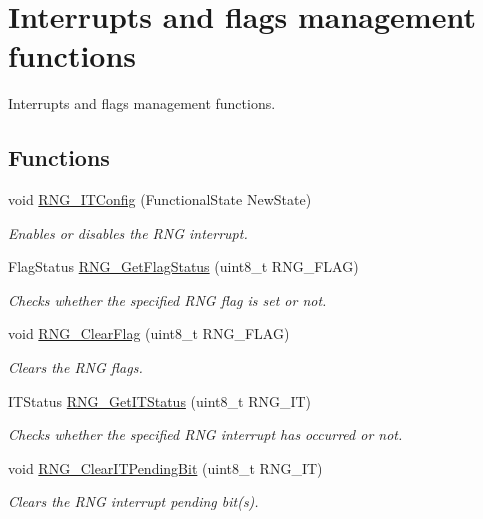\hypertarget{group___r_n_g___group3}{\section{Interrupts and flags management functions}
\label{group___r_n_g___group3}
}


Interrupts and flags management functions.  


\subsection*{Functions}
\begin{DoxyCompactItemize}
\item 
void \hyperlink{group___r_n_g___group3_ga41d9be4c303ba0875a82c62dc7085f08}{R\-N\-G\-\_\-\-I\-T\-Config} (Functional\-State New\-State)
\begin{DoxyCompactList}\small\item\em Enables or disables the R\-N\-G interrupt. \end{DoxyCompactList}\item 
Flag\-Status \hyperlink{group___r_n_g___group3_gab70d6cc7d943dfb8eac15ccecf6cd7b3}{R\-N\-G\-\_\-\-Get\-Flag\-Status} (uint8\-\_\-t R\-N\-G\-\_\-\-F\-L\-A\-G)
\begin{DoxyCompactList}\small\item\em Checks whether the specified R\-N\-G flag is set or not. \end{DoxyCompactList}\item 
void \hyperlink{group___r_n_g___group3_gac3c67fe6bacdc4529f1707025224f954}{R\-N\-G\-\_\-\-Clear\-Flag} (uint8\-\_\-t R\-N\-G\-\_\-\-F\-L\-A\-G)
\begin{DoxyCompactList}\small\item\em Clears the R\-N\-G flags. \end{DoxyCompactList}\item 
I\-T\-Status \hyperlink{group___r_n_g___group3_gab58eaab67698770d9ea9775fb280271f}{R\-N\-G\-\_\-\-Get\-I\-T\-Status} (uint8\-\_\-t R\-N\-G\-\_\-\-I\-T)
\begin{DoxyCompactList}\small\item\em Checks whether the specified R\-N\-G interrupt has occurred or not. \end{DoxyCompactList}\item 
void \hyperlink{group___r_n_g___group3_ga2b1c78c003cd5c886e09fdbc2c89cacb}{R\-N\-G\-\_\-\-Clear\-I\-T\-Pending\-Bit} (uint8\-\_\-t R\-N\-G\-\_\-\-I\-T)
\begin{DoxyCompactList}\small\item\em Clears the R\-N\-G interrupt pending bit(s). \end{DoxyCompactList}\end{DoxyCompactItemize}


